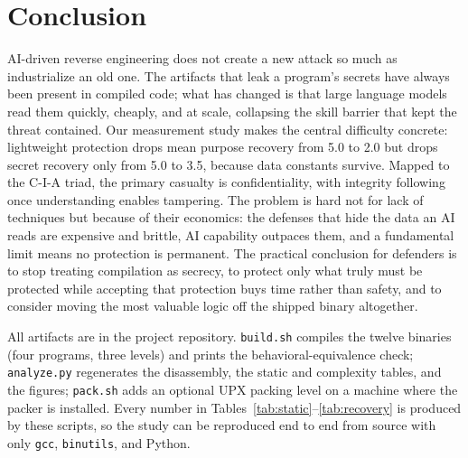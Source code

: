 \documentclass[conference]{IEEEtran}
\begin{document}
\section{Conclusion}
AI-driven reverse engineering does not create a new attack so much as industrialize
an old one. The artifacts that leak a program's secrets have always been present in
compiled code; what has changed is that large language models read them quickly,
cheaply, and at scale, collapsing the skill barrier that kept the threat contained.
Our measurement study makes the central difficulty concrete: lightweight protection
drops mean purpose recovery from 5.0 to 2.0 but drops secret recovery only from 5.0
to 3.5, because data constants survive. Mapped to the C-I-A triad, the primary
casualty is confidentiality, with integrity following once understanding enables
tampering. The problem is hard not for lack of techniques but because of their
economics: the defenses that hide the data an AI reads are expensive and brittle, AI
capability outpaces them, and a fundamental limit means no protection is permanent.
The practical conclusion for defenders is to stop treating compilation as secrecy, to
protect only what truly must be protected while accepting that protection buys time
rather than safety, and to consider moving the most valuable logic off the shipped
binary altogether.

\appendix[Reproducibility]
All artifacts are in the project repository. \texttt{build.sh} compiles the twelve
binaries (four programs, three levels) and prints the behavioral-equivalence check;
\texttt{analyze.py} regenerates the disassembly, the static and complexity tables,
and the figures; \texttt{pack.sh} adds an optional UPX packing level on a machine
where the packer is installed. Every number in
Tables~\ref{tab:static}--\ref{tab:recovery} is produced by these scripts, so the
study can be reproduced end to end from source with only \texttt{gcc},
\texttt{binutils}, and Python.
\end{document}

